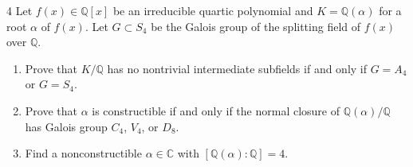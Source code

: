 \documentclass[12pt]{article}
\begin{document}
\begin{problem}{4}
    Let $f(x) \in \mathbb{Q}[x]$ be an irreducible quartic polynomial and $K = \mathbb{Q}(\alpha)$ for a root $\alpha$ of $f(x)$. Let $G \subset S_4$ be the Galois group of the splitting field of $f(x)$ over $\mathbb{Q}$.

    \begin{enumerate}
        \item[(a)] Prove that $K/\mathbb{Q}$ has no nontrivial intermediate subfields if and only if $G = A_4$ or $G = S_4$.

        \item[(b)] Prove that $\alpha$ is constructible if and only if the normal closure of $\mathbb{Q}(\alpha)/\mathbb{Q}$ has Galois group $C_4$, $V_4$, or $D_8$.

        \item[(c)] Find a nonconstructible $\alpha \in \mathbb{C}$ with $[\mathbb{Q}(\alpha) : \mathbb{Q}] = 4$.
    \end{enumerate}
\end{problem}
\end{document}
